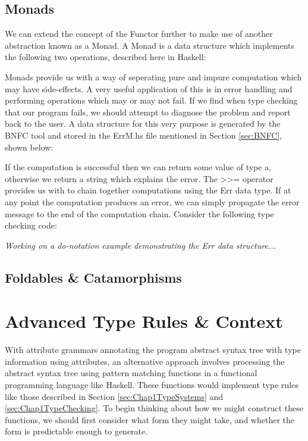 \documentclass{UoYCSproject}
\begin{document}
\subsection{Monads}
We can extend the concept of the Functor further to make use of another
abstraction known as a Monad. A Monad is a data structure which implements the
following two operations, described here in Haskell:

Monads provide us with a way of seperating pure and impure computation which
may have side-effects. A very useful application of this is in error handling
and performing operations which may or may not fail. If we find when type
checking that our program fails, we should attempt to diagnose the problem and
report back to the user. A data structure for this very purpose is generated by
the BNFC tool and stored in the {\ttfamily ErrM.hs} file mentioned in Section
\ref{sec:BNFC}, shown below:

If the computation is successful then we can return some value of type
{\ttfamily a}, otherwise we return a string which explains the error. The
{\ttfamily >>=} operator provides us with to chain together computations using
the {\ttfamily Err} data type. If at any point the computation produces an
error, we can simply propagate the error message to the end of the computation
chain. Consider the following type checking code:
%

\textit{Working on a do-notation example demonstrating the Err data structure...}

\subsection{Foldables \& Catamorphisms}

\cite{PierceCategory}
\cite{MilewskiCTFP}
\cite{HuttonHaskell}
\cite{Catamorphisms}

\section{Advanced Type Rules \& Context}
With attribute grammars annotating the program abstract syntax tree with type
information using attributes, an alternative approach involves processing the
abstract syntax tree using pattern matching functions in a functional programming
language like Haskell. These functions would implement type rules like those
described in Section \ref{sec:Chap1TypeSystems} and \ref{sec:Chap1TypeChecking}.
To begin thinking about how we might construct these functions, we should first
consider what form they might take, and whether the form is predictable enough
to generate.
\end{document}
